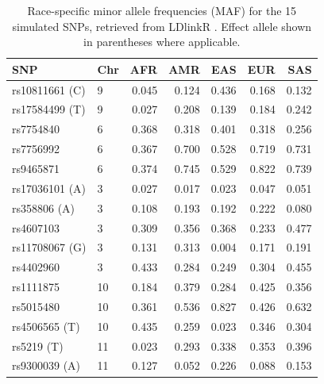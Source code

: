 \begin{table}[ht]
\centering
\caption{Race-specific minor allele frequencies (MAF) for the 15 simulated SNPs, retrieved from LDlinkR \citep{Machiela2015}. Effect allele shown in parentheses where applicable.}
\label{tab:app_snp_maf}
\small
\begin{tabular}{llrrrrr}
\hline
\textbf{SNP} & \textbf{Chr} & \textbf{AFR} & \textbf{AMR} &
\textbf{EAS} & \textbf{EUR} & \textbf{SAS} \\
\hline
rs10811661 (C) &  9 & 0.045 & 0.124 & 0.436 & 0.168 & 0.132 \\
rs17584499 (T) &  9 & 0.027 & 0.208 & 0.139 & 0.184 & 0.242 \\
rs7754840      &  6 & 0.368 & 0.318 & 0.401 & 0.318 & 0.256 \\
rs7756992      &  6 & 0.367 & 0.700 & 0.528 & 0.719 & 0.731 \\
rs9465871      &  6 & 0.374 & 0.745 & 0.529 & 0.822 & 0.739 \\
rs17036101 (A) &  3 & 0.027 & 0.017 & 0.023 & 0.047 & 0.051 \\
rs358806 (A)   &  3 & 0.108 & 0.193 & 0.192 & 0.222 & 0.080 \\
rs4607103      &  3 & 0.309 & 0.356 & 0.368 & 0.233 & 0.477 \\
rs11708067 (G) &  3 & 0.131 & 0.313 & 0.004 & 0.171 & 0.191 \\
rs4402960      &  3 & 0.433 & 0.284 & 0.249 & 0.304 & 0.455 \\
rs1111875      & 10 & 0.184 & 0.379 & 0.284 & 0.425 & 0.356 \\
rs5015480      & 10 & 0.361 & 0.536 & 0.827 & 0.426 & 0.632 \\
rs4506565 (T)  & 10 & 0.435 & 0.259 & 0.023 & 0.346 & 0.304 \\
rs5219 (T)     & 11 & 0.023 & 0.293 & 0.338 & 0.353 & 0.396 \\
rs9300039 (A)  & 11 & 0.127 & 0.052 & 0.226 & 0.088 & 0.153 \\
\hline
\end{tabular}
\end{table}

